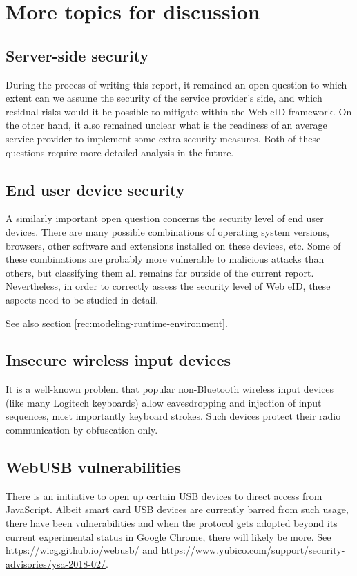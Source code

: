 \chapter{More topics for discussion}

\section{Server-side security}
During the process of writing this report, it remained an open question to which extent can we assume the security of the service provider's side, and which residual risks would it be possible to mitigate within the Web eID framework. On the other hand, it also remained unclear what is the readiness of an average service provider to implement some extra security measures. Both of these questions require more detailed analysis in the future.

\section{End user device security}
A similarly important open question concerns the security level of end user devices. There are many possible combinations of operating system versions, browsers, other software and extensions installed on these devices, etc. Some of these combinations are probably more vulnerable to malicious attacks than others, but classifying them all remains far outside of the current report. Nevertheless, in order to correctly assess the security level of Web eID, these aspects need to be studied in detail. 

See also section \ref{rec:modeling-runtime-environment}.


\section{Insecure wireless input devices}

It is a well-known problem that popular non-Bluetooth wireless input devices (like many Logitech keyboards) allow eavesdropping and injection of input sequences, most importantly keyboard strokes. Such devices protect their radio communication by obfuscation only.

\section{WebUSB vulnerabilities}

There is an initiative to open up certain USB devices to direct access from JavaScript. Albeit smart card USB devices are currently barred from such usage, there have been vulnerabilities and when the protocol gets adopted beyond its current experimental status in Google Chrome, there will likely be more. See \url{https://wicg.github.io/webusb/} and \url{https://www.yubico.com/support/security-advisories/ysa-2018-02/}.

